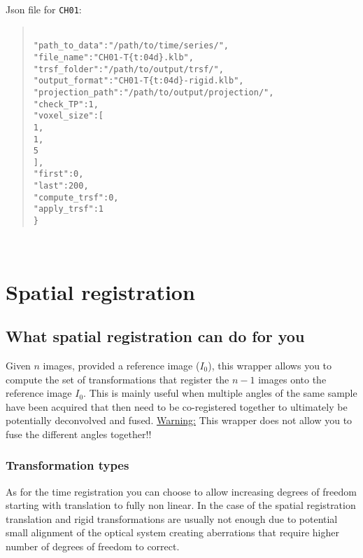 \documentclass[10pt,a4paper]{book}
\newcommand\tab[1][.6cm]{\hspace*{#1}}
\newenvironment{code}[1]{\mbox{}\\[1ex]\hspace*{-#1cm}\begin{minipage}{150mm}\begin{quote}\tt}{\end{quote}\end{minipage}\mbox{}\\[1ex]}
\begin{document}
Json file for \texttt{CH01}:
\begin{code}{0.8}
\{\\
\tab"path\_to\_data":"/path/to/time/series/",\\
\tab"file\_name":"CH01-T\{t:04d\}.klb",\\
\tab"trsf\_folder":"/path/to/output/trsf/",\\
\tab"output\_format":"CH01-T\{t:04d\}-rigid.klb",\\
\tab"projection\_path":"/path/to/output/projection/",\\
\tab"check\_TP":1,\\
\tab"voxel\_size":[\\
\tab\tab1,\\
\tab\tab1,\\
\tab\tab5\\
\tab],\\
\tab"first":0,\\
\tab"last":200,\\
\tab"compute\_trsf":0,\\
\tab"apply\_trsf":1\\
\}
\end{code}
\chapter{Spatial registration}
\section{What spatial registration can do for you}
Given $n$ images, provided a reference image ($I_0$), this wrapper allows you to compute the set of transformations that register the $n-1$ images onto the reference image $I_0$. This is mainly useful when multiple angles of the same sample have been acquired that then need to be co-registered together to ultimately be potentially deconvolved and fused. \underline{Warning:} This wrapper does not allow you to fuse the different angles together!!
\subsection{Transformation types}
As for the time registration you can choose to allow increasing degrees of freedom starting with translation to fully non linear. In the case of the spatial registration translation and rigid transformations are usually not enough due to potential small alignment of the optical system creating aberrations that require higher number of degrees of freedom to correct.
\end{document}
